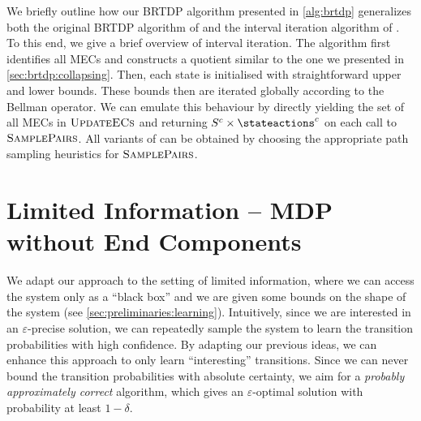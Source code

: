 \documentclass{article}
\newcommand{\States}{S}
\newcommand{\samplepath}{\textsc{SamplePairs}}
\newcommand{\updateecs}{\textsc{UpdateECs}}
\begin{document}
We briefly outline how our BRTDP algorithm presented in \cref{alg:brtdp} generalizes both the original BRTDP algorithm of \cite{DBLP:conf/atva/BrazdilCCFKKPU14} and the interval iteration algorithm of \cite{DBLP:conf/rp/HaddadM14}.
To this end, we give a brief overview of interval iteration.
The algorithm first identifies all MECs and constructs a quotient similar to the one we presented in \cref{sec:brtdp:collapsing}.
Then, each state is initialised with straightforward upper and lower bounds.
These bounds then are iterated globally according to the Bellman operator.
We can emulate this behaviour by directly yielding the set of all MECs in $\updateecs$ and returning $\States^c \times \stateactions^c$ on each call to $\samplepath$.
All variants of \cite{DBLP:conf/atva/BrazdilCCFKKPU14} can be obtained by choosing the appropriate path sampling heuristics for $\samplepath$.
 	\section{Limited Information -- MDP without End Components} \label{sec:dql_no_ec}

We adapt our approach to the setting of limited information, where we can access the system only as a \enquote{black box} and we are given some bounds on the shape of the system (see \cref{sec:preliminaries:learning}).
Intuitively, since we are interested in an $\varepsilon$-precise solution, we can repeatedly sample the system to learn the transition probabilities with high confidence.
By adapting our previous ideas, we can enhance this approach to only learn \enquote{interesting} transitions.
Since we can never bound the transition probabilities with absolute certainty, we aim for a \emph{probably approximately correct} algorithm, which gives an $\varepsilon$-optimal solution with probability at least $1 - \delta$.
\end{document}
